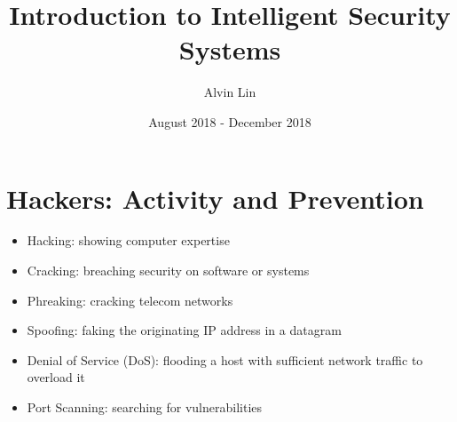 \documentclass{math}
\title{Introduction to Intelligent Security Systems}
\author{Alvin Lin}
\date{August 2018 - December 2018}
\begin{document}
\maketitle

\section*{Hackers: Activity and Prevention}
\begin{itemize}
  \item Hacking: showing computer expertise
  \item Cracking: breaching security on software or systems
  \item Phreaking: cracking telecom networks
  \item Spoofing: faking the originating IP address in a datagram
  \item Denial of Service (DoS): flooding a host with sufficient network traffic
    to overload it
  \item Port Scanning: searching for vulnerabilities
\end{itemize}
\end{document}
